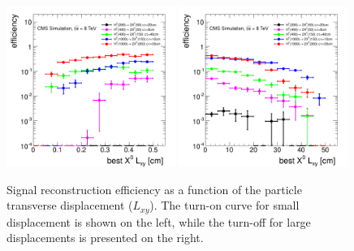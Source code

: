 \begin{figure}[htbp]
\includegraphics[width=0.49\textwidth]{plots/signal/effSmallLxy.pdf}
\includegraphics[width=0.49\textwidth]{plots/signal/effLxy.pdf}
\caption{Signal reconstruction efficiency as a function of the \X particle transverse 
displacement ($L_{xy}$). The turn-on curve for small displacement is shown on the left,
while the turn-off for large displacements is presented on the right.\label{fig:effLxy}}
\end{figure}
